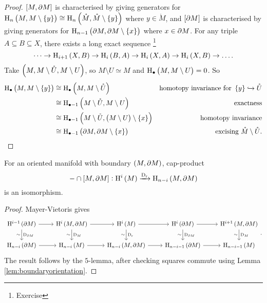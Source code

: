 \begin{proof}
$ \sbr{M, \da M} $ is characterised by giving generators for $ \H_n\br{M, M \setminus \cbr{y}} \cong \H_n\br{\mathring{M}, \mathring{M} \setminus \cbr{y}} $ where $ y \in \mathring{M} $, and $ \sbr{\da M} $ is characterised by giving generators for $ \H_{n - 1}\br{\da M, \da M \setminus \cbr{x}} $ where $ x \in \partial M $. For any triple $ A \subseteq B \subseteq X $, there exists a long exact sequence \footnote{Exercise}
$$ \dots \to \H_{i + 1}\br{X, B} \to \H_i\br{B, A} \to \H_i\br{X, A} \to \H_i\br{X, B} \to \dots. $$
Take $ \br{M, M \setminus \mathring{U}, M \setminus U} $, so $ M \setminus U \simeq M $ and $ \H_\bullet\br{M, M \setminus U} = 0 $. So
\begin{align*}
\H_\bullet\br{M, M \setminus \cbr{y}}
& \cong \H_\bullet\br{M, M \setminus \mathring{U}} & \text{homotopy invariance for} \ \cbr{y} \hookrightarrow \mathring{U} \\
& \cong \H_{\bullet - 1}\br{M \setminus \mathring{U}, M \setminus U} & \text{exactness} \\
& \cong \H_{\bullet - 1}\br{M \setminus \mathring{U}, \br{M \setminus U} \setminus \cbr{x}} & \text{homotopy invariance} \\
& \cong \H_{\bullet - 1}\br{\da M, \da M \setminus \cbr{x}} & \text{excising} \ \mathring{M} \setminus \mathring{U}.
\end{align*}
\end{proof}

\begin{corollary}
For an oriented manifold with boundary $ \br{M, \da M} $, cap-product
$$ - \cap \sbr{M, \da M} : \H^i\br{M} \xrightarrow{\D_\r} \H_{n - i}\br{M, \da M} $$
is an isomorphism.
\end{corollary}

\begin{proof}
Mayer-Vietoris gives
$$
\begin{tikzcd}
\H^{i - 1}\br{\da M} \arrow{r} \arrow{d}{\D_{\da M}}[swap]{\sim} & \H^i\br{M, \da M} \arrow{r} \arrow{d}{\D_M}[swap]{\sim} & \H^i\br{M} \arrow{r} \arrow{d}{\D_\r}[swap]{\sim} & \H^i\br{\da M} \arrow{r} \arrow{d}{\D_{\da M}}[swap]{\sim} & \H^{i + 1}\br{M, \da M} \arrow{d}{\D_M}[swap]{\sim} \\
\H_{n - i}\br{\da M} \arrow{r} & \H_{n - i}\br{M} \arrow{r} & \H_{n - i}\br{M, \da M} \arrow{r} & \H_{n - i - 1}\br{\da M} \arrow{r} & \H_{n - i - 1}\br{M}
\end{tikzcd}.
$$
The result follows by the $ 5 $-lemma, after checking squares commute using Lemma \ref{lem:boundaryorientation}.
\end{proof}


